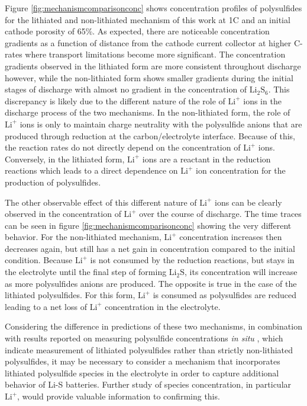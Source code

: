 \documentclass{elsarticle}
\begin{document}
Figure \ref{fig:mechanismcomparisonconc} shows concentration profiles of polysulfides for the lithiated and non-lithiated mechanism of this work at 1C and an initial cathode porosity of 65\%. As expected, there are noticeable concentration gradients as a function of distance from the cathode current collector at higher C-rates where transport limitations become more significant. The concentration gradients observed in the lithiated form are more consistent throughout discharge however, while the non-lithiated form shows smaller gradients during the initial stages of discharge with almost no gradient in the concentration of $\mathrm{Li}_2\mathrm{S}_6$. This discrepancy is likely due to the different nature of the role of $\mathrm{Li}^+$ ions in the discharge process of the two mechanisms. In the non-lithiated form, the role of $\mathrm{Li}^+$ ions is only to maintain charge neutrality with the polysulfide anions that are produced through reduction at the carbon/electrolyte interface. Because of this, the reaction rates do not directly depend on the concentration of $\mathrm{Li}^+$ ions. Conversely, in the lithiated form, $\mathrm{Li}^+$ ions are a reactant in the reduction reactions which leads to a direct dependence on $\mathrm{Li}^+$ ion concentration for the production of polysulfides. 

The other observable effect of this different nature of $\mathrm{Li}^+$ ions can be clearly observed in the concentration of $\mathrm{Li}^+$ over the course of discharge. The time traces can be seen in figure \ref{fig:mechanismcomparisonconc} showing the very different behavior. For the non-lithiated mechanism, $\mathrm{Li}^+$ concentration increases then decreases again, but still has a net gain in concentration compared to the initial condition. Because $\mathrm{Li}^+$ is not consumed by the reduction reactions, but stays in the electrolyte until the final step of forming $\mathrm{Li}_2\mathrm{S}$, its concentration will increase as more polysulfides anions are produced. The opposite is true in the case of the lithiated polysulfides. For this form, $\mathrm{Li}^+$ is consumed as polysulfides are reduced leading to a net loss of $\mathrm{Li}^+$ concentration in the electrolyte. 

Considering the difference in predictions of these two mechanisms, in combination with results reported on measuring polysulfide concentrations \textit{in situ} \cite{SAQIB2017266}, which indicate measurement of lithiated polysulfides rather than strictly non-lithiated polysulfides, it may be necessary to consider a mechanism that incorporates lithiated polysulfide species in the electrolyte in order to capture additional behavior of Li-S batteries. Further study of species concentration, in particular $\mathrm{Li}^+$, would provide valuable information to confirming this.
\end{document}
